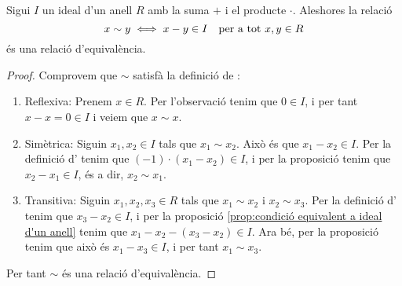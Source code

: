 \documentclass[../Apunts.tex]{subfiles}
\begin{document}
	\begin{proposition}
		\label{prop:relació d'equivalència en anells per ideals}
		Sigui \(I\) un ideal d'un anell \(R\) amb la suma \(+\) i el producte \(\cdot\). Aleshores la relació
		\[x\sim y\iff x-y\in I\quad\text{per a tot }x,y\in R\]
		és una relació d'equivalència.
		\begin{proof}
			Comprovem que \(\sim\) satisfà la definició de :
			\begin{enumerate}
				\item Reflexiva: Prenem \(x\in R\). Per l'observació  tenim que \(0\in I\), i per tant \(x-x=0\in I\) i veiem que \(x\sim x\).
				\item Simètrica: Siguin \(x_{1},x_{2}\in I\) tals que \(x_{1}\sim x_{2}\). Això és que \(x_{1}-x_{2}\in I\). Per la definició d' tenim que \((-1)\cdot(x_{1}-x_{2})\in I\), i per la proposició  tenim que \(x_{2}-x_{1}\in I\), és a dir, \(x_{2}\sim x_{1}\).
				\item Transitiva: Siguin \(x_{1},x_{2},x_{3}\in R\) tals que \(x_{1}\sim x_{2}\) i \(x_{2}\sim x_{3}\). Per la definició d' tenim que \(x_{3}-x_{2}\in I\), i per la proposició \ref{prop:condició equivalent a ideal d'un anell} tenim que \(x_{1}-x_{2}-(x_{3}-x_{2})\in I\). Ara bé, per la proposició  tenim que això és \(x_{1}-x_{3}\in I\), i per tant \(x_{1}\sim x_{3}\).
			\end{enumerate}
			Per tant \(\sim\) és una relació d'equivalència.
		\end{proof}
	\end{proposition}
\end{document}

